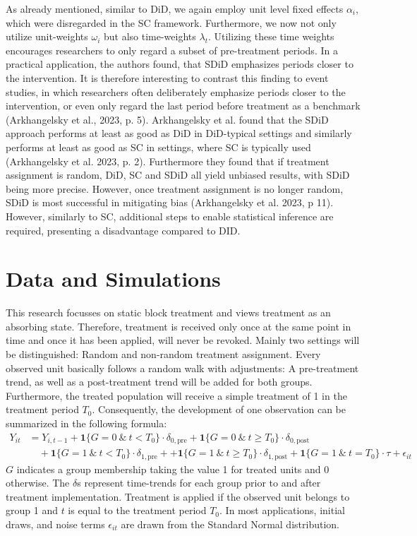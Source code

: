 \documentclass[8pt]{article}
\begin{document}
As already mentioned, similar to DiD, we again employ unit level fixed effects $\alpha_i$, which were disregarded in the SC framework. Furthermore, we now not only utilize unit-weights $\omega_i$ but also time-weights $\lambda_t$. Utilizing these time weights encourages researchers to only regard a subset of pre-treatment periods. In a practical application, the authors found, that SDiD emphasizes periods closer to the intervention. It is therefore interesting to contrast this finding to event studies, in which researchers often deliberately emphasize periods closer to the intervention, or even only regard the last period before treatment as a benchmark (Arkhangelsky et al., 2023, p. 5).
Arkhangelsky et al. found that the SDiD approach performs at least as good as DiD in DiD-typical settings and similarly performs at least as good as SC in settings, where SC is typically used (Arkhangelsky et al. 2023, p. 2). Furthermore they found that if treatment assignment is random, DiD, SC and SDiD all yield unbiased results, with SDiD being more precise. However, once treatment assignment is no longer random, SDiD is most successful in mitigating bias (Arkhangelsky et al. 2023, p 11).
However, similarly to SC, additional steps to enable statistical inference are required, presenting a disadvantage compared to DID.

\section{Data and Simulations}
This research focusses on static block treatment and views treatment as an absorbing state. Therefore, treatment is received only once at the same point in time and once it has been applied, will never be revoked. Mainly two settings will be distinguished: Random and non-random treatment assignment. 
Every observed unit basically follows a random walk with adjustments: A pre-treatment trend, as well as a post-treatment trend will be added for both groups. Furthermore, the treated population will receive a simple treatment of 1 in the treatment period $T_0$. 
Consequently, the development of one observation can be summarized in the following formula:
\begin{align*}
Y_{it} &= Y_{i,t-1} + \mathbf{1}{\{G = 0 \ \& \ t < T_0\}} \cdot \delta_{0,\text{pre}} + \mathbf{1}{\{G = 0 \ \& \ t \geq T_0\}} \cdot \delta_{0,\text{post}} \nonumber\\
&\quad + \mathbf{1}{\{G = 1 \ \& \ t < T_0\}} \cdot \delta_{1,\text{pre}} + + \mathbf{1}{\{G = 1 \ \& \ t \geq T_0\}} \cdot \delta_{1,\text{post}} + \mathbf{1}{\{G = 1 \ \& \ t = T_0\}} \cdot \tau + \epsilon_{it} 
\end{align*}
$G$ indicates a group membership taking the value 1 for treated units and 0 otherwise. The $\delta$s represent time-trends for each group prior to and after treatment implementation. Treatment is applied if the observed unit belongs to group 1 and $t$ is equal to the treatment period $T_0$. In most applications, initial draws, and noise terms $\epsilon_{it}$ are drawn from the Standard Normal distribution.
\end{document}
